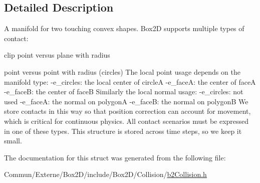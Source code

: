 \subsection{Detailed Description}
A manifold for two touching convex shapes. Box2D supports multiple types of contact\+:
\begin{DoxyItemize}
\item clip point versus plane with radius
\item point versus point with radius (circles) The local point usage depends on the manifold type\+: -\/e\+\_\+circles\+: the local center of circleA -\/e\+\_\+faceA\+: the center of faceA -\/e\+\_\+faceB\+: the center of faceB Similarly the local normal usage\+: -\/e\+\_\+circles\+: not used -\/e\+\_\+faceA\+: the normal on polygonA -\/e\+\_\+faceB\+: the normal on polygonB We store contacts in this way so that position correction can account for movement, which is critical for continuous physics. All contact scenarios must be expressed in one of these types. This structure is stored across time steps, so we keep it small. 
\end{DoxyItemize}

The documentation for this struct was generated from the following file\+:\begin{DoxyCompactItemize}
\item 
Commun/\+Externe/\+Box2\+D/include/\+Box2\+D/\+Collision/\hyperlink{b2_collision_8h}{b2\+Collision.\+h}\end{DoxyCompactItemize}
